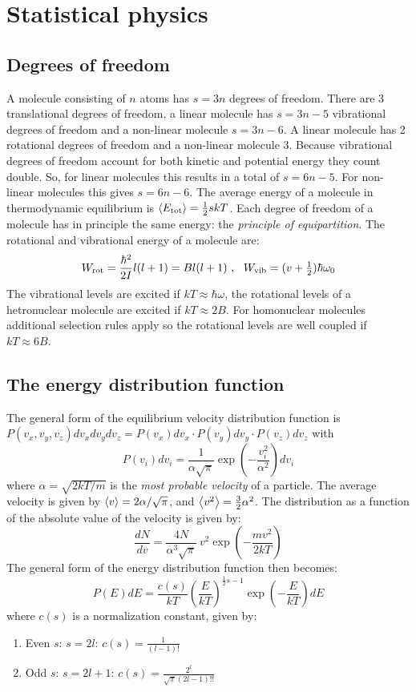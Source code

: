 \documentclass[a4paper]{report}
\begin{document}
\chapter{Statistical physics}
\section{Degrees of freedom}
A molecule consisting of $n$ atoms has $s=3n$ degrees of freedom. There are
3 translational degrees of freedom, a linear molecule has $s=3n-5$
vibrational degrees of freedom and a non-linear molecule $s=3n-6$. A linear
molecule has 2 rotational degrees of freedom and a non-linear molecule 3.
\npar
Because vibrational degrees of freedom account for both kinetic and potential
energy they count double. So, for linear molecules this results in a total of
$s=6n-5$. For non-linear molecules this gives $s=6n-6$. The average energy of
a molecule in thermodynamic equilibrium is $\left\langle E_{\rm tot} \right\rangle=\frac{1}{2}skT$.
Each degree of freedom of a molecule has in principle the same energy: the
{\it principle of equipartition}.
\npar
The rotational and vibrational energy of a molecule are:
\[
W_{\rm rot}=\frac{\hbar^2}{2I}l(l+1)=Bl(l+1)~,~~W_{\rm vib}=(v+\mbox{$\frac{1}{2}$})\hbar\omega_0
\]
The vibrational levels are excited if $kT\approx\hbar\omega$, the
rotational levels of a hetronuclear molecule are excited if $kT\approx2B$.
For homonuclear molecules additional selection rules apply so the rotational
levels are well coupled if $kT\approx6B$.

\section{The energy distribution function}
The general form of the equilibrium velocity distribution function is\\
$P(v_x,v_y,v_z)dv_xdv_ydv_z=P(v_x)dv_x\cdot P(v_y)dv_y\cdot P(v_z)dv_z$ with
\[
P(v_i)dv_i=\frac{1}{\alpha\sqrt{\pi}}\exp\left(-\frac{v_i^2}{\alpha^2}\right)dv_i
\]
where $\alpha=\sqrt{2kT/m}$ is the {\it most probable velocity} of a particle.
The average velocity is given by $\left\langle v \right\rangle=2\alpha/\sqrt{\pi}$, and
$\left\langle v^2 \right\rangle=\frac{3}{2}\alpha^2$. The distribution as a function of the
absolute value of the velocity is given by:
\[
\frac{dN}{dv}=\frac{4N}{\alpha^3\sqrt{\pi}}~v^2\exp\left(-\frac{mv^2}{2kT}\right)
\]
The general form of the energy distribution function then becomes:
\[
P(E)dE=\frac{c(s)}{kT}\left(\frac{E}{kT}\right)^{\frac{1}{2}s-1}\exp\left(-\frac{E}{kT}\right)dE
\]
where $c(s)$ is a normalization constant, given by:
\begin{enumerate}
\item Even $s$: $s=2l$: $\displaystyle c(s)=\frac{1}{(l-1)!}$
\item Odd $s$: $s=2l+1$: $\displaystyle c(s)=\frac{2^l}{\sqrt{\pi}(2l-1)!!}$
\end{enumerate}
\end{document}
